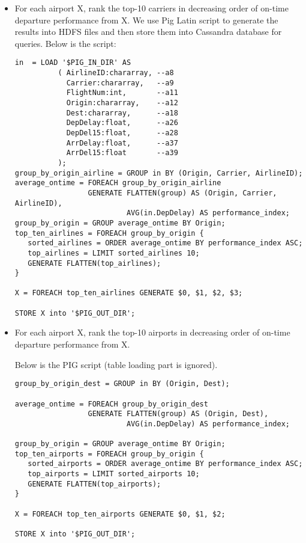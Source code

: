 \documentclass[fontsize=11pt,paper=a4]{scrartcl}
\begin{document}
\begin{itemize} 
\item For each airport X, rank the top-10 carriers in decreasing order of on-time departure performance from X. We use Pig Latin script to generate the results into HDFS files and then store them into Cassandra database for queries. Below is the script: 
\small\begin{verbatim}
in  = LOAD '$PIG_IN_DIR' AS 
          ( AirlineID:chararray, --a8
            Carrier:chararray,   --a9
            FlightNum:int,       --a11
            Origin:chararray,    --a12       
            Dest:chararray,      --a18
            DepDelay:float,      --a26
            DepDel15:float,      --a28
            ArrDelay:float,      --a37 
            ArrDel15:float       --a39
          );
group_by_origin_airline = GROUP in BY (Origin, Carrier, AirlineID);
average_ontime = FOREACH group_by_origin_airline 
                 GENERATE FLATTEN(group) AS (Origin, Carrier, AirlineID), 
                          AVG(in.DepDelay) AS performance_index;
group_by_origin = GROUP average_ontime BY Origin; 
top_ten_airlines = FOREACH group_by_origin {
   sorted_airlines = ORDER average_ontime BY performance_index ASC;
   top_airlines = LIMIT sorted_airlines 10;
   GENERATE FLATTEN(top_airlines);
}

X = FOREACH top_ten_airlines GENERATE $0, $1, $2, $3;

STORE X into '$PIG_OUT_DIR'; 
\end{verbatim}
\normalsize

\item For each airport X, rank the top-10 airports in decreasing order of on-time departure performance from X.

Below is the PIG script (table loading part is ignored). 
\small\begin{verbatim}
group_by_origin_dest = GROUP in BY (Origin, Dest);

average_ontime = FOREACH group_by_origin_dest 
                 GENERATE FLATTEN(group) AS (Origin, Dest), 
                          AVG(in.DepDelay) AS performance_index;

group_by_origin = GROUP average_ontime BY Origin; 
top_ten_airports = FOREACH group_by_origin {
   sorted_airports = ORDER average_ontime BY performance_index ASC;
   top_airports = LIMIT sorted_airports 10;
   GENERATE FLATTEN(top_airports);
}

X = FOREACH top_ten_airports GENERATE $0, $1, $2;

STORE X into '$PIG_OUT_DIR'; 
\end{verbatim}
\normalsize


\end{itemize}
\end{document}
